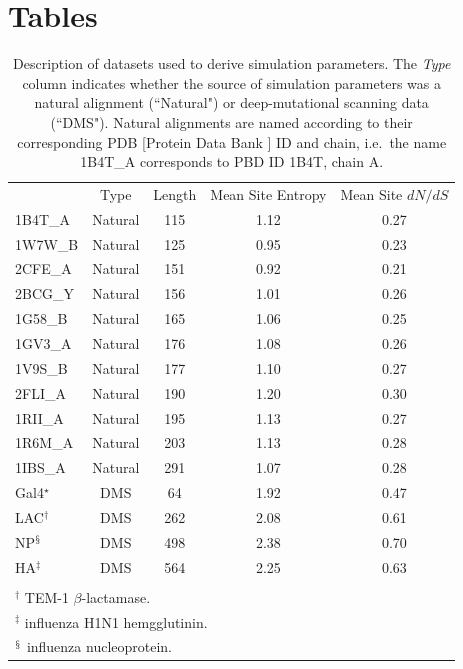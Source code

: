 \documentclass[11pt]{article}
\begin{document}
\clearpage


\section*{Tables}
\vspace{3cm}




\begin{table}[htbp]
	\caption {\label{tab:datasets} Description of datasets used to derive simulation parameters. The \emph{Type} column indicates whether the source of simulation parameters was a natural alignment (``Natural") or deep-mutational scanning data (``DMS"). Natural alignments are named according to their corresponding PDB [Protein Data Bank \citep{pdb}] ID and chain, i.e.\ the name 1B4T\_A corresponds to PBD ID 1B4T, chain A.}
	\begin{tabular}{l c c c c}
		\hline\noalign{\smallskip}
		\multicolumn{1}{c}{Name} & Type & Length & Mean Site Entropy & Mean Site $dN/dS$ \\
		\noalign{\smallskip}\hline\noalign{\smallskip}
            1B4T\_A & Natural & 115 & 1.12 & 0.27 \\
            1W7W\_B & Natural & 125 & 0.95 & 0.23 \\
            2CFE\_A & Natural & 151 & 0.92 & 0.21 \\
            2BCG\_Y & Natural & 156 & 1.01 & 0.26 \\
            1G58\_B & Natural & 165 & 1.06 & 0.25 \\
            1GV3\_A & Natural & 176 & 1.08 & 0.26 \\
            1V9S\_B & Natural & 177 & 1.10 & 0.27 \\
            2FLI\_A & Natural & 190 & 1.20 & 0.30 \\
            1RII\_A & Natural & 195 & 1.13 & 0.27 \\
            1R6M\_A & Natural & 203 & 1.13 & 0.28 \\
            1IBS\_A & Natural & 291 & 1.07 & 0.28 \\
            Gal4$^\star$ & DMS & 64 & 1.92 & 0.47 \\
            LAC$^\dagger$ & DMS & 262 & 2.08 & 0.61 \\
            NP$^\mathsection$ & DMS & 498 & 2.38 & 0.70 \\
            HA$^\ddagger$ & DMS & 564 & 2.25 & 0.63 \\
		\noalign{\smallskip}\hline\noalign{\smallskip}
		\multicolumn{5}{l}{\footnotesize{$^\star$ yeast Gal4.}} \\
        \multicolumn{5}{l}{\footnotesize{$^\dagger$ TEM-1 $\beta$-lactamase.}} \\
        \multicolumn{5}{l}{\footnotesize{$^\ddagger$ influenza H1N1 hemgglutinin.}} \\
        \multicolumn{5}{l}{\footnotesize{$^\mathsection$ influenza nucleoprotein.}} \\
	\end{tabular}
 \end{table}
\end{document}
